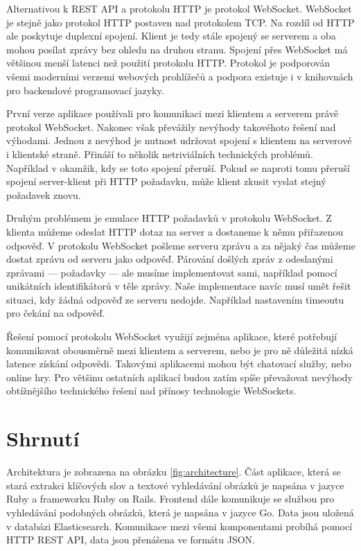 Alternativou k REST API a protokolu HTTP je protokol WebSocket\cite{websocket}. WebSocket je stejně jako protokol HTTP postaven nad protokolem TCP. Na rozdíl od HTTP ale poskytuje duplexní spojení. Klient je tedy stále spojený se serverem a oba mohou posílat zprávy bez ohledu na druhou stranu. Spojení přes WebSocket má většinou menší latenci než použití protokolu HTTP\cite{websocket-study}. Protokol je podporován všemi moderními verzemi webových prohlížečů a podpora existuje i v knihovnách pro backendové programovací jazyky.

První verze aplikace používali pro komunikaci mezi klientem a serverem právě protokol WebSocket. Nakonec však převážily nevýhody takovéhoto řešení nad výhodami. Jednou z nevýhod je nutnost udržovat spojení s klientem na serverové i klientské straně. Přináší to několik netriviálních technických problémů. Například v okamžik, kdy se toto spojení přeruší. Pokud se naproti tomu přeruší spojení server-klient při HTTP požadavku, může klient zkusit vyslat stejný požadavek znovu.

Druhým problémem je emulace HTTP požadavků v protokolu WebSocket. Z klienta můžeme odeslat HTTP dotaz na server a dostaneme k němu přiřazenou odpověď. V protokolu WebSocket pošleme serveru zprávu a za nějaký čas můžeme dostat zprávu od serveru jako odpověď. Párování došlých zpráv z odeslanými zprávami --- požadavky --- ale musíme implementovat sami, například pomocí unikátních identifikátorů v těle zprávy. Naše implementace navíc musí umět řešit situaci, kdy žádná odpověď ze serveru nedojde. Například nastavením timeoutu pro čekání na odpověď.

Řešení pomocí protokolu WebSocket využijí zejména aplikace, které potřebují komunikovat obousměrně mezi klientem a serverem, nebo je pro ně důležitá nízká latence získání odpovědi. Takovými aplikacemi mohou být chatovací služby, nebo online hry. Pro většinu ostatních aplikací budou zatím spíše převažovat nevýhody obtížnějšího technického řešení nad přínosy technologie WebSockets.

\section{Shrnutí}


Architektura je zobrazena na obrázku \ref{fig:architecture}. Část aplikace, která se stará extrakci klíčových slov a textové vyhledávání obrázků je napsána v jazyce Ruby a frameworku Ruby on Rails. Frontend dále komunikuje se službou pro vyhledávání podobných obrázků, která je napsána v jazyce Go. Data jsou uložená v databázi Elasticsearch. Komunikace mezi všemi komponentami probíhá pomocí HTTP REST API, data jsou přenášena ve formátu JSON.








